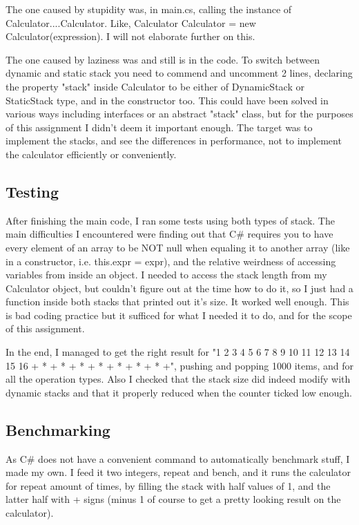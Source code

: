 \documentclass{article}
\begin{document}
The one caused by stupidity was, in main.cs, calling the instance of Calculator....Calculator. Like, Calculator Calculator = new Calculator(expression). I will not elaborate further on this.

The one caused by laziness was and still is in the code. To switch between dynamic and static stack you need to commend and uncomment 2 lines, declaring the property "stack" inside Calculator to be either of DynamicStack or StaticStack type, and in the constructor too. This could have been solved in various ways including interfaces or an abstract "stack" class, but for the purposes of this assignment I didn't deem it important enough. The target was to implement the stacks, and see the differences in performance, not to implement the calculator efficiently or conveniently. 

\subsection{Testing}

After finishing the main code, I ran some tests using both types of stack. The main difficulties I encountered were finding out that C# requires you to have every element of an array to be NOT null when equaling it to another array (like in a constructor, i.e. this.expr = expr), and the relative weirdness of accessing variables from inside an object. I needed to access the stack length from my Calculator object, but couldn't figure out at the time how to do it, so I just had a function inside both stacks that printed out it's size. It worked well enough. This is bad coding practice but it sufficed for what I needed it to do, and for the scope of this assignment.

In the end, I managed to get the right result for "1 2 3 4 5 6 7 8 9 10 11 12 13 14 15 16 + * + * + * + * + * + * + * +", pushing and popping 1000 items, and for all the operation types. Also I checked that the stack size did indeed modify with dynamic stacks and that it properly reduced when the counter ticked low enough. 


\subsection{Benchmarking}

As C# does not have a convenient command to automatically benchmark stuff, I made my own. I feed it two integers, repeat and bench, and it runs the calculator for repeat amount of times, by filling the stack with half values of 1, and the latter half with + signs (minus 1 of course to get a pretty looking result on the calculator). 
\end{document}

